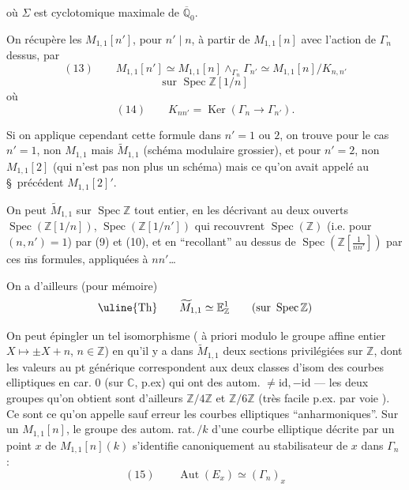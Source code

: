 
 où $\Sigma$  est  cyclotomique maximale de $\overline{\mathbb Q}_0$.

 On récupère les $M_{1,1}[n']$, pour $n'\mid n$,  à partir de $M_{1,1}[n]$ avec l'action de $\Gamma_n$ dessus, par
\[
(13)\qquad M_{1,1}[n']\simeq M_{1,1}[n]\wedge_{\Gamma_n}\Gamma_{n'}\simeq M_{1,1}[n]/K_{n,n'}
\]
\[
\text{sur }\operatorname{Spec}\mathbb Z[1/n]
\]
où
\[
(14)\qquad K_{nn'}=\operatorname{Ker}(\Gamma_n\longrightarrow\Gamma_{n'}).
\]


Si on applique cependant cette formule dans  $n'=1$ ou $2$, on trouve pour le cas $n'=1$, non $M_{1,1}$ mais $\widetilde M_{1,1}$ (schéma modulaire grossier), et pour $n'=2$, non $M_{1,1}[2]$ (qui n'est pas non plus un schéma) mais ce qu'on avait appelé au \S\ précédent $M_{1,1}[2]'$.

On peut    $\widetilde M_{1,1}$ sur $\operatorname{Spec}\mathbb Z$ tout entier,  en les décrivant au  deux ouverts $\operatorname{Spec}(\mathbb Z[1/n])$, $\operatorname{Spec}(\mathbb Z[1/n'])$ qui recouvrent $\operatorname{Spec}(\mathbb Z)$ (i.e. pour $(n,n')=1$) par (9) et (10),  et en ``recollant''  au dessus de $\operatorname{Spec}(\mathbb Z[\frac{1}{nn'}])$ par ces $\overline{\mathrm m}$s formules, appliquées à $nn'$\ldots


On a d'ailleurs (pour mémoire)
\[
\text{\uline{Th}}\qquad \widetilde M_{1,1}\simeq\mathbb E^1_{\mathbb Z}\qquad(\text{sur }\operatorname{Spec}\mathbb Z)
\]

On peut épingler un tel isomorphisme ( à priori modulo le groupe affine entier $X\longmapsto\pm X+n$, $n\in\mathbb Z$) en  qu'il y a dans $\widetilde M_{1,1}$ deux sections privilégiées sur $\mathbb Z$, dont les valeurs au pt générique correspondent aux deux classes d'isom des courbes elliptiques en car. $0$ (sur $\mathbb C$, p.ex) qui ont des autom. $\ne\mathrm{id},-\mathrm{id}$ --- les deux groupes  qu'on obtient sont d'ailleurs $\mathbb Z/4\mathbb Z$ et $\mathbb Z/6\mathbb Z$ (très facile p.ex. par voie ). Ce sont ce qu'on appelle sauf erreur les courbes elliptiques ``anharmoniques''. Sur un $M_{1,1}[n]$, le groupe des autom. rat.\,$/k$ d'une courbe elliptique décrite par un point $x$ de $M_{1,1}[n](k)$ s'identifie canoniquement au stabilisateur de $x$ dans $\Gamma_n$ :
\[
(15)\qquad\operatorname{Aut}(E_x)\simeq(\Gamma_n)_x
\]

